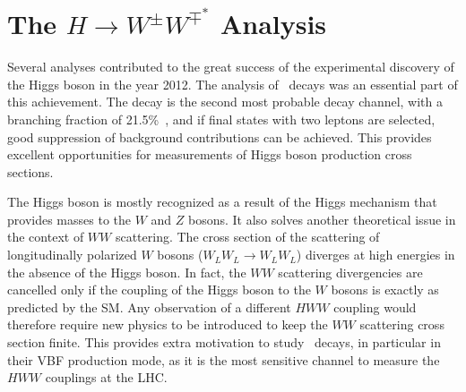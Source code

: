 \chapter{The $H\rightarrow W^{\pm}W^{\mp^*}$ Analysis}
\label{chap:hww}


Several analyses contributed to the great success of the experimental discovery of the Higgs boson in the year 2012. The analysis of \HWWdet\ decays was an essential part of this achievement. 
The \HWW decay is the second most probable decay channel, with a branching fraction of 21.5\%~\cite{PDG2020}, and if final states with two leptons are selected, good suppression of background contributions can be achieved.
This provides excellent opportunities for measurements of Higgs boson production cross sections.

The Higgs boson is mostly recognized as a result of the Higgs mechanism that provides masses to the $W$ and $Z$ bosons. 
It also solves another theoretical issue in the context of $WW$ scattering.
The cross section of the scattering of longitudinally polarized $W$ bosons ($W_LW_L \to W_LW_L$) diverges at high energies in the absence of the Higgs boson. In fact, the $WW$ scattering divergencies are cancelled only if the coupling of the Higgs boson to the $W$ bosons is exactly as predicted by the SM. Any observation of a different $HWW$ coupling would therefore require new physics to be introduced to keep the $WW$ scattering cross section finite. 
This provides extra motivation to study \HWW\ decays, in particular in their VBF production mode, as it is the most sensitive channel to measure the $HWW$ couplings at the LHC.

